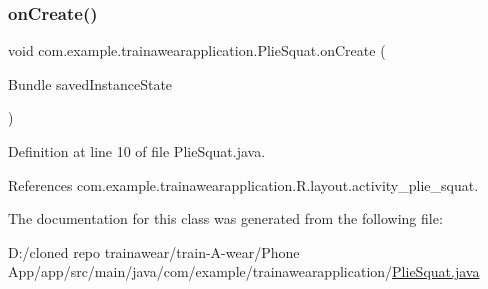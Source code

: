 \subsubsection{\texorpdfstring{onCreate()}{onCreate()}}
{\footnotesize\ttfamily void com.\+example.\+trainawearapplication.\+Plie\+Squat.\+on\+Create (\begin{DoxyParamCaption}\item[{Bundle}]{saved\+Instance\+State }\end{DoxyParamCaption})\hspace{0.3cm}{\ttfamily [protected]}}



Definition at line 10 of file Plie\+Squat.\+java.


\begin{DoxyCode}{0}

\end{DoxyCode}


References com.\+example.\+trainawearapplication.\+R.\+layout.\+activity\+\_\+plie\+\_\+squat.



The documentation for this class was generated from the following file\+:\begin{DoxyCompactItemize}
\item 
D\+:/cloned repo trainawear/train-\/\+A-\/wear/\+Phone App/app/src/main/java/com/example/trainawearapplication/\mbox{\hyperlink{_plie_squat_8java}{Plie\+Squat.\+java}}\end{DoxyCompactItemize}
